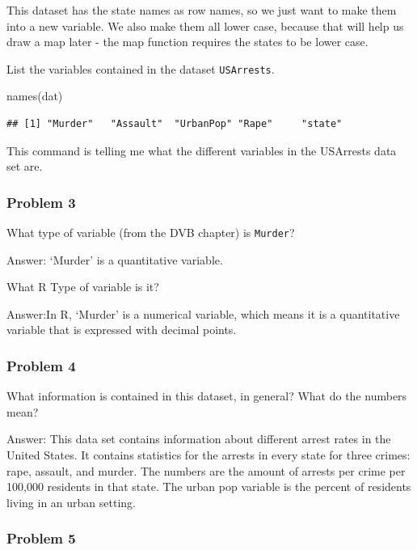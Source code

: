 \documentclass[
]{article}
\newenvironment{Shaded}{\begin{snugshade}}{\end{snugshade}}
\newcommand{\FunctionTok}[1]{\textcolor[rgb]{0.00,0.00,0.00}{#1}}
\newcommand{\NormalTok}[1]{#1}
\begin{document}
This dataset has the state names as row names, so we just want to make
them into a new variable. We also make them all lower case, because that
will help us draw a map later - the map function requires the states to
be lower case.

List the variables contained in the dataset \texttt{USArrests}.

\begin{Shaded}
\begin{Highlighting}[]
\FunctionTok{names}\NormalTok{(dat)}
\end{Highlighting}
\end{Shaded}

\begin{verbatim}
## [1] "Murder"   "Assault"  "UrbanPop" "Rape"     "state"
\end{verbatim}

This command is telling me what the different variables in the USArrests
data set are.

\hypertarget{problem-3}{%
\subsubsection{Problem 3}\label{problem-3}}

What type of variable (from the DVB chapter) is \texttt{Murder}?

Answer: `Murder' is a quantitative variable.

What R Type of variable is it?

Answer:In R, `Murder' is a numerical variable, which means it is a
quantitative variable that is expressed with decimal points.

\hypertarget{problem-4}{%
\subsubsection{Problem 4}\label{problem-4}}

What information is contained in this dataset, in general? What do the
numbers mean?

Answer: This data set contains information about different arrest rates
in the United States. It contains statistics for the arrests in every
state for three crimes: rape, assault, and murder. The numbers are the
amount of arrests per crime per 100,000 residents in that state. The
urban pop variable is the percent of residents living in an urban
setting.

\hypertarget{problem-5}{%
\subsubsection{Problem 5}\label{problem-5}}
\end{document}
